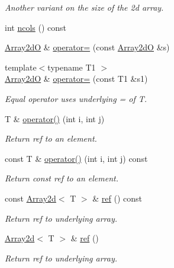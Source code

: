 \begin{DoxyCompactItemize}
\begin{DoxyCompactList}\small\item\em Another variant on the size of the 2d array. \end{DoxyCompactList}\item 
int \mbox{\hyperlink{classADAT_1_1Array2dO_a68d75259fbc18eb14504e3b6d74f2484}{ncols}} () const
\item 
\mbox{\hyperlink{classADAT_1_1Array2dO}{Array2dO}} \& \mbox{\hyperlink{classADAT_1_1Array2dO_a258fcfecc226990cc40b36f1edb2f4d5}{operator=}} (const \mbox{\hyperlink{classADAT_1_1Array2dO}{Array2dO}} \&s)
\item 
{\footnotesize template$<$typename T1 $>$ }\\\mbox{\hyperlink{classADAT_1_1Array2dO}{Array2dO}} \& \mbox{\hyperlink{classADAT_1_1Array2dO_a82bf731b5d6edfc53b941b5815647a6e}{operator=}} (const T1 \&s1)
\begin{DoxyCompactList}\small\item\em Equal operator uses underlying = of T. \end{DoxyCompactList}\item 
T \& \mbox{\hyperlink{classADAT_1_1Array2dO_ace450ca2a5484194b075e240750cfeae}{operator()}} (int i, int j)
\begin{DoxyCompactList}\small\item\em Return ref to an element. \end{DoxyCompactList}\item 
const T \& \mbox{\hyperlink{classADAT_1_1Array2dO_a3093245fdc65b66ac6d410d66feb2020}{operator()}} (int i, int j) const
\begin{DoxyCompactList}\small\item\em Return const ref to an element. \end{DoxyCompactList}\item 
const \mbox{\hyperlink{classXMLArray_1_1Array2d}{Array2d}}$<$ T $>$ \& \mbox{\hyperlink{classADAT_1_1Array2dO_a376d2e36985a9c05e09bd33244865997}{ref}} () const
\begin{DoxyCompactList}\small\item\em Return ref to underlying array. \end{DoxyCompactList}\item 
\mbox{\hyperlink{classXMLArray_1_1Array2d}{Array2d}}$<$ T $>$ \& \mbox{\hyperlink{classADAT_1_1Array2dO_aa409325aa8f61b6f9a6aeeca2746b4cb}{ref}} ()
\begin{DoxyCompactList}\small\item\em Return ref to underlying array. \end{DoxyCompactList}\item 

\end{DoxyCompactItemize}
